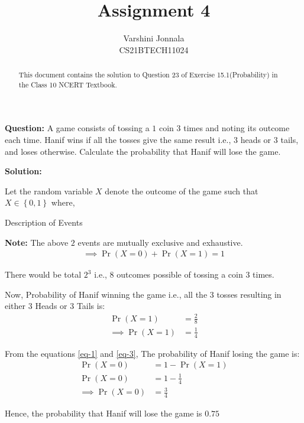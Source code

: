 \documentclass[journal,12pt,twocolumn]{IEEEtran}
\title{Assignment 4}
\author{Varshini Jonnala\\CS21BTECH11024}
\DeclareMathOperator*{\equals}{=}
\providecommand{\pr}[1]{\ensuremath{\Pr\left(#1\right)}}
\providecommand{\cbrak}[1]{\ensuremath{\left\{#1\right\}}}
\newcommand{\solution}{\noindent \textbf{Solution: }}
\newcommand{\note}{\noindent \textbf{Note: }}
\begin{document}
    \maketitle

    \begin{abstract}
    This document contains the solution to Question 23 of Exercise 15.1(Probability) in the Class 10 NCERT Textbook.  
    \end{abstract}
    
    \noindent \textbf{Question: } A game consists of tossing a \rupee$1$ coin $3$ times and noting its outcome each time. Hanif wins if all the tosses give the same result i.e., $3$ heads or $3$ tails, and loses otherwise. Calculate the probability that Hanif will lose the game.
    
    \solution
    
    Let the random variable $X$ denote the outcome of the game such that $X \in \cbrak{0,1}$ where,  
    \begin{table}[ht!]
        \centering
        
    	\caption{Description of Events}
    	\label{Tables:Table}
    \end{table}
    
    \note The above $2$ events are mutually exclusive and exhaustive. 
    \begin{align}
        \implies \pr{X = 0} + \pr{X = 1} \equals 1 \label{eq-1}
    \end{align}
    
    \noindent There would be total $2^3$ i.e., $8$ outcomes possible of tossing a coin $3$ times.  
    
    
    Now, Probability of Hanif winning the game i.e., all the $3$ tosses resulting in either $3$ Heads or $3$ Tails is:
    \begin{align}
        \pr{X = 1} &= \frac{2}{8} \label{eq-2} \\
        \implies \pr{X=1} &= \frac{1}{4} \label{eq-3}
    \end{align}
    
    \noindent From the equations \ref{eq-1} and \ref{eq-3}, The probability of Hanif losing the game is:
    \begin{align}
        \pr{X = 0} &= 1 - \pr{X = 1}\\
        \pr{X = 0} &= 1 - \frac{1}{4}\\
        \implies \pr{X = 0} &= \frac{3}{4}
    \end{align}
    
    Hence, the probability that Hanif will lose the game is $0.75$ 
\end{document}
